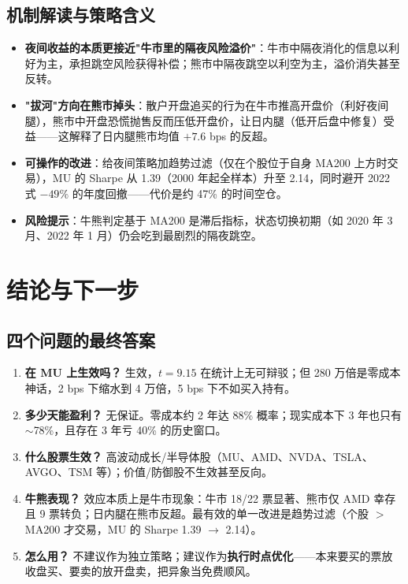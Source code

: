 \documentclass[11pt,a4paper,fontset=none]{ctexart}
\begin{document}
\subsection{机制解读与策略含义}
\begin{itemize}\itemsep2pt
  \item \textbf{夜间收益的本质更接近"牛市里的隔夜风险溢价"}：牛市中隔夜消化的信息以利好为主，承担跳空风险获得补偿；熊市中隔夜跳空以利空为主，溢价消失甚至反转。
  \item \textbf{"拔河"方向在熊市掉头}：散户开盘追买的行为在牛市推高开盘价（利好夜间腿），熊市中开盘恐慌抛售反而压低开盘价，让日内腿（低开后盘中修复）受益——这解释了日内腿熊市均值 $+7.6$ bps 的反超。
  \item \textbf{可操作的改进}：给夜间策略加趋势过滤（仅在个股位于自身 MA200 上方时交易），MU 的 Sharpe 从 1.39（2000 年起全样本）升至 2.14，同时避开 2022 式 $-49\%$ 的年度回撤——代价是约 47\% 的时间空仓。
  \item \textbf{风险提示}：牛熊判定基于 MA200 是滞后指标，状态切换初期（如 2020 年 3 月、2022 年 1 月）仍会吃到最剧烈的隔夜跳空。
\end{itemize}

\section{结论与下一步}
\subsection{四个问题的最终答案}
\begin{enumerate}\itemsep2pt
  \item \textbf{在 MU 上生效吗？} 生效，$t=9.15$ 在统计上无可辩驳；但 280 万倍是零成本神话，2 bps 下缩水到 4 万倍，5 bps 下不如买入持有。
  \item \textbf{多少天能盈利？} 无保证。零成本约 2 年达 88\% 概率；现实成本下 3 年也只有 $\sim$78\%，且存在 3 年亏 40\% 的历史窗口。
  \item \textbf{什么股票生效？} 高波动成长/半导体股（MU、AMD、NVDA、TSLA、AVGO、TSM 等）；价值/防御股不生效甚至反向。
  \item \textbf{牛熊表现？} 效应本质上是牛市现象：牛市 18/22 票显著、熊市仅 AMD 幸存且 9 票转负；日内腿在熊市反超。最有效的单一改进是趋势过滤（个股 $>$ MA200 才交易，MU 的 Sharpe 1.39 $\to$ 2.14）。
  \item \textbf{怎么用？} 不建议作为独立策略；建议作为\textbf{执行时点优化}——本来要买的票放收盘买、要卖的放开盘卖，把异象当免费顺风。
\end{enumerate}
\end{document}
